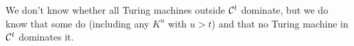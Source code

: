 \documentclass[10pt,a4paper,oneside]{article}
\newtheorem{lma}{Lemma}
\newtheorem{dfn}{Definition}
\begin{document}
We don't know whether all Turing machines outside ${\cal C}^t$ dominate, but we do know that some do (including any $K^u$ with $u > t$) and that no Turing machine in ${\cal C}^t$ dominates it. 






\end{document}
